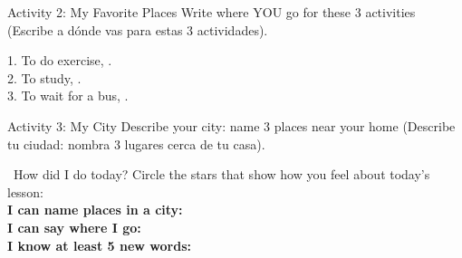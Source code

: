 \begin{activity}{Activity 2: My Favorite Places }
  Write where YOU go for these 3 activities (Escribe a dónde vas para estas 3 actividades).
  
  1. To do exercise, \answerline[5cm].\\
  2. To study, \answerline[5cm].\\
  3. To wait for a bus, \answerline[5cm].
\end{activity}

\begin{activity}{Activity 3: My City }
  Describe your city: name 3 places near your home (Describe tu ciudad: nombra 3 lugares cerca de tu casa).
  \writinglines[3]
\end{activity}

\vspace{1em}
\begin{grammartip}{ \ How did I do today?}
  Circle the stars that show how you feel about today's lesson:\\[6pt]
  \textbf{I can name places in a city:} \selfcheck[0] \\[4pt]
  \textbf{I can say where I go:} \selfcheck[0] \\[4pt]
  \textbf{I know at least 5 new words:} \selfcheck[0]
\end{grammartip}
